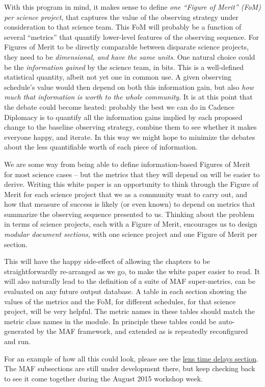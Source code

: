 With this program in mind, it makes sense to define {\it one ``Figure
of Merit'' (FoM) per science project}, that captures the value of  the
observing strategy under consideration to that science team. This FoM
will probably be a function of several ``metrics'' that quantify
lower-level features of the observing sequence.  For Figures of Merit
to be directly comparable between disparate science projects,  they
need to be {\it dimensional, and have the same units}. One natural
choice could be the {\it information gained} by the science team, in
bits. This is a well-defined statistical quantity, albeit not yet one
in common use. A given observing schedule's value would then depend on
both this information gain, but also {\it how much that information is
worth to the whole community}. It is at this point that the debate
could become heated: probably the best we can do in Cadence Diplomacy
is to quantify all the information gains implied by each proposed
change to the baseline  observing strategy, combine them to see
whether it makes everyone happy, and iterate. In this way we might
hope to minimize the debates about the less quantifiable worth of each
piece of information.

We are some way from being able to define information-based Figures of
Merit for most science cases -- but the metrics that they will depend
on will be easier to derive. Writing this white paper is an
opportunity to think through the Figure of Merit for each science
project that we as a community want to carry out, and how that measure
of success is likely (or even known) to depend on metrics that
summarize the observing sequence presented to us. Thinking about the
problem in terms of science projects, each with a  Figure of Merit,
encourages us to design {\it modular document
sections,} with one science project and one Figure of Merit per section.

This will have the happy side-effect of allowing the chapters to be
straightforwardly re-arranged as we go, to make the white paper easier
to read. It will also naturally lead to the definition of a suite of
MAF  super-metrics, can be evaluated on any future \OpSim output
database.  A table in each section showing the values of the metrics
and the FoM, for different schedules, for that science project, will
be very helpful. The metric names in these tables should match the
metric class names in the
\href{https://github.com/LSST-nonproject/sims_maf_contrib/wiki}{\simsMafContrib}
module. In principle these tables could be auto-generated by the MAF
framework, and extended as \OpSim is repeatedly reconfigured and run.

For an example of how all this could look, please see the
\hyperref[sec:lenstimedelays]{lens
time delays section}. The MAF subsections are still under development
there, but keep checking back to see it come together during the
August 2015 workshop week.


\navigationbar

